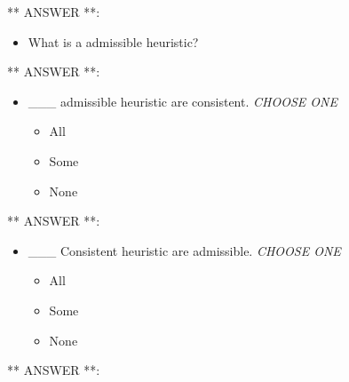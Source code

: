 \documentclass[11pt]{article}
\providecommand{\tightlist}{%
      \setlength{\itemsep}{0pt}\setlength{\parskip}{0pt}}
\begin{document}
** ANSWER **:

    \begin{itemize}
\tightlist
\item
  What is a admissible heuristic?
\end{itemize}

** ANSWER **:

    \begin{itemize}
\tightlist
\item
  \_\_\_ admissible heuristic are consistent. \emph{CHOOSE ONE}

  \begin{itemize}
  \tightlist
  \item
    All
  \item
    Some
  \item
    None
  \end{itemize}
\end{itemize}

** ANSWER **:

    \begin{itemize}
\tightlist
\item
  \_\_\_ Consistent heuristic are admissible. \emph{CHOOSE ONE}

  \begin{itemize}
  \tightlist
  \item
    All
  \item
    Some
  \item
    None
  \end{itemize}
\end{itemize}

** ANSWER **:


    
    
    
    
\end{document}
